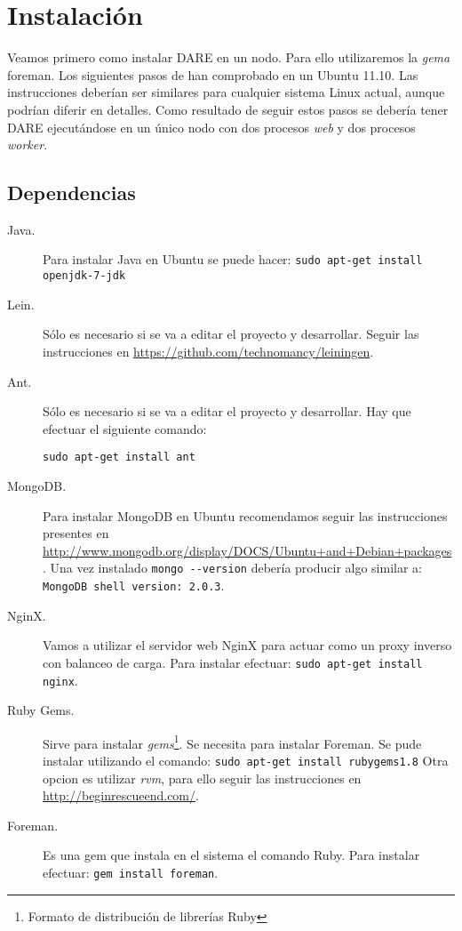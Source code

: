 \section{Instalación}
\label{local_installation}
Veamos primero como instalar DARE en un nodo. Para ello
utilizaremos la \emph{gema} foreman. Los siguientes pasos de han
comprobado en un Ubuntu 11.10. Las instrucciones deberían ser
similares para cualquier sistema Linux actual, aunque podrían diferir
en detalles. Como resultado de seguir estos pasos se debería tener
DARE ejecutándose en un único nodo con dos procesos \emph{web} y dos
procesos \emph{worker}.

\subsection{Dependencias}
\begin{description}
\item[Java.] Para instalar Java en Ubuntu se puede hacer:
  \verb+sudo apt-get install openjdk-7-jdk+
\item[Lein.] Sólo es necesario si se va a editar el proyecto y
  desarrollar. Seguir las instrucciones en
  \url{https://github.com/technomancy/leiningen}.
\item[Ant.] Sólo es necesario si se va a editar el proyecto y
  desarrollar. Hay que efectuar el siguiente comando:

  \verb+sudo apt-get install ant+

\item[MongoDB.] Para instalar MongoDB en Ubuntu recomendamos seguir
  las instrucciones presentes en
  \url{http://www.mongodb.org/display/DOCS/Ubuntu+and+Debian+packages}. Una
  vez instalado \verb+mongo --version+ debería producir algo similar
  a: \verb+MongoDB shell version: 2.0.3+.
\item[NginX.] Vamos a utilizar el servidor web NginX para actuar como
  un proxy inverso con balanceo de carga. Para instalar efectuar:
  \verb+sudo apt-get install nginx+.
\item[Ruby Gems.] Sirve para instalar
  \emph{gems}\cite{RUBY_GEMS}\footnote{Formato de distribución de
    librerías Ruby}. Se necesita para instalar Foreman.  Se pude
  instalar utilizando el comando:
  \verb+sudo apt-get install rubygems1.8+ Otra opcion es utilizar
  \emph{rvm}, para ello seguir las instrucciones en
  \url{http://beginrescueend.com/}.
\item[Foreman.] Es una gem que instala en el sistema el comando
  Ruby. Para instalar efectuar: \verb+gem install foreman+.
\end{description}

